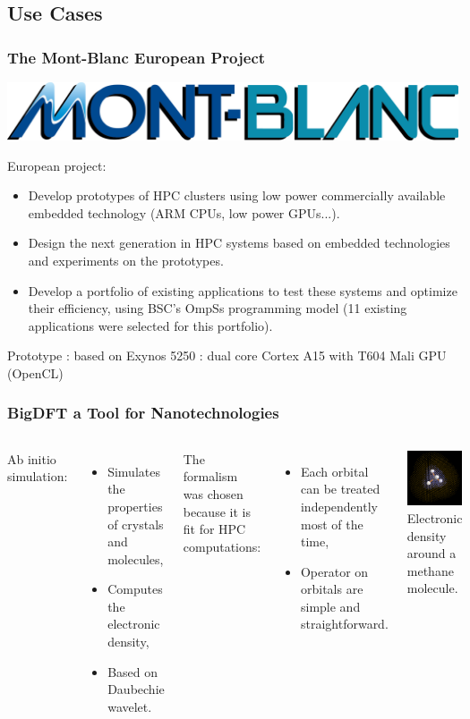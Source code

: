 \documentclass{beamer}
\begin{document}
\subsection{Use Cases}

\begin{frame}
\frametitle{The Mont-Blanc European Project}
\begin{center}
\includegraphics[scale=0.3]{Mont-Blanc_logo-horizontal}
\end{center}
European project:
\begin{itemize}
\item Develop prototypes of HPC clusters using low power commercially available embedded technology (ARM CPUs, low power GPUs...).
\item Design the next generation in HPC systems based on embedded technologies and experiments on the prototypes.
\item Develop a portfolio of existing applications to test these systems and optimize their efficiency, using BSC's OmpSs programming model (11 existing applications were selected for this portfolio).
\end{itemize}
Prototype : based on Exynos 5250 : dual core Cortex A15 with T604 Mali GPU (OpenCL)
\end{frame}

\begin{frame}
    \frametitle{BigDFT a Tool for Nanotechnologies}
\begin{columns}
\column{6cm}
Ab initio simulation:
\begin{itemize}
  \item Simulates the properties of crystals and molecules,
  \item Computes the electronic density,
  \item Based on Daubechie wavelet.
\end{itemize}
The formalism was chosen because it is fit for HPC computations: 
\begin{itemize}
\item Each orbital can be treated independently most of the time,
\item Operator on orbitals are simple and straightforward.
\end{itemize}
\column{4.5cm}
\centering
\includegraphics[width=3.5cm]{CH4-grid.png}\\
Electronic density around a methane molecule.
\end{columns}
\end{frame}
\end{document}
